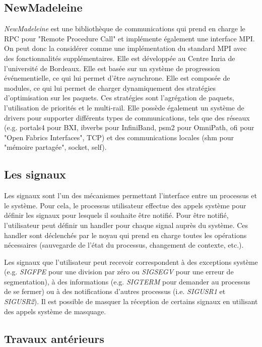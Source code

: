 \subsection{NewMadeleine}

\emph{NewMadeleine} est une bibliothèque de communications qui prend en charge le RPC pour "Remote Procedure Call" et implémente également une interface MPI.
On peut donc la considérer comme une implémentation du standard MPI avec des fonctionnalités supplémentaires.
Elle est développée au Centre Inria de l'université de Bordeaux.
Elle est basée sur un système de progression événementielle, ce qui lui permet d'être asynchrone.
Elle est composée de modules, ce qui lui permet de charger dynamiquement des stratégies d'optimisation sur les paquets.
Ces stratégies sont l'agrégation de paquets, l'utilisation de priorités et le multi-rail. %
Elle possède également un système de drivers pour supporter différents types de communications, tels que des réseaux
(e.g. portals4 pour BXI, ibverbs pour InfiniBand, psm2 pour OmniPath, ofi pour "Open Fabrics Interfaces", TCP) %
et des communications locales (shm pour "mémoire partagée", socket, self).

\subsection{Les signaux}
\label{sec:signal}

Les signaux\cite{linuxSignalMan} sont l'un des mécanismes permettant l'interface entre un processus et le système.
Pour cela, le processus utilisateur effectue des appels système pour définir les signaux pour lesquels il souhaite être notifié.
Pour être notifié, l'utilisateur peut définir un handler pour chaque signal auprès du système.
Ces handler sont déclenchés par le noyau qui prend en charge toutes les opérations nécessaires (sauvegarde de l'état du processus, changement de contexte, etc.).

Les signaux que l'utilisateur peut recevoir correspondent à des exceptions système (e.g. \emph{SIGFPE} pour une division par zéro ou \emph{SIGSEGV} pour une erreur de segmentation),
à des informations (e.g. \emph{SIGTERM} pour demander au processus de se fermer) ou à des notifications d'autres processus (i.e. \emph{SIGUSR1} et \emph{SIGUSR2}).
Il est possible de masquer la réception de certains signaux en utilisant des appels système de masquage.

\subsection{Travaux antérieurs}

